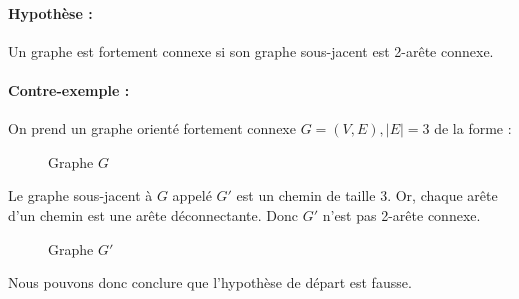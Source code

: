 \documentclass[11pt, a4paper]{article}
\begin{document}
\paragraph{Hypothèse :}Un graphe est fortement connexe si son graphe sous-jacent est 2-arête connexe. 

\paragraph{Contre-exemple :} On prend un graphe orienté fortement connexe $G = (V, E), |E| = 3$ de la forme : 
\begin{figure}[h]
\centering


\caption{Graphe $G$}
\end{figure}

Le graphe sous-jacent à $G$ appelé $G'$ est un chemin de taille 3. Or, chaque arête d'un chemin est une arête déconnectante. Donc $G'$ n'est pas 2-arête connexe.

\begin{figure}[h]
\centering
{}

\caption{Graphe $G'$}
\end{figure}

Nous pouvons donc conclure que l'hypothèse de départ est fausse.
\end{document}
